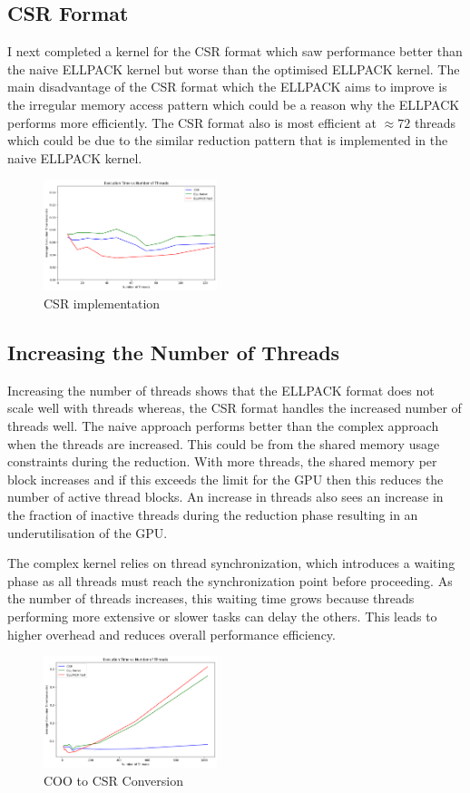 \documentclass[conference]{IEEEtran}
\begin{document}
\subsection{CSR Format}
I next completed a kernel for the CSR format which saw performance better than the naive ELLPACK kernel but worse than the optimised ELLPACK kernel.
The main disadvantage of the CSR format which the ELLPACK aims to improve is the irregular memory access pattern which could be a reason why the ELLPACK performs more efficiently.
The CSR format also is most efficient at $\approx72$ threads which could be due to the similar reduction pattern that is implemented in the naive ELLPACK kernel.  
\begin{figure}[H]
    \centering
    \includegraphics[width=0.45\textwidth]{../img/gpuzoomed.png}
    \caption{CSR implementation}
    \label{fig:parallel}
\end{figure}

\subsection{Increasing the Number of Threads}
Increasing the number of threads shows that the ELLPACK format does not scale well with threads whereas, the CSR format handles the increased number of threads well.
The naive approach performs better than the complex approach when the threads are increased. 
This could be from the shared memory usage constraints during the reduction.
With more threads, the shared memory per block increases and if this exceeds the limit for the GPU then this reduces the number of active thread blocks.
An increase in threads also sees an increase in the fraction of inactive threads during the reduction phase resulting in an underutilisation of the GPU.

The complex kernel relies on thread synchronization, which introduces a waiting phase as all threads must reach the synchronization point before proceeding. As the number of threads increases, this waiting time grows because threads performing more extensive or slower tasks can delay the others. This leads to higher overhead and reduces overall performance efficiency.
\begin{figure}[H]
    \centering
    \includegraphics[width=0.45\textwidth]{../img/gpu.png}
    \caption{COO to CSR Conversion}
    \label{fig:conversion}
\end{figure}
\end{document}

